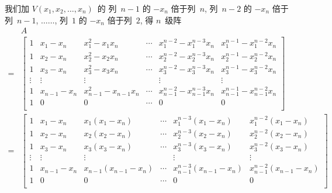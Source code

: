 \begin{example}
    我们加 \(V(x_1, x_2, \dots, x_n)\)~的%
    列~\(n-1\) 的 \(-x_n\) 倍于列~\(n\),
    列~\(n-2\) 的 \(-x_n\) 倍于列~\(n-1\),
    \(\dots \dots\),
    列~\(1\) 的 \(-x_n\) 倍于列~\(2\),
    得 \(n\)~级阵
    \begin{align*}
             & A
        \\
        = {} &
        \begin{bmatrix}
            1      & x_1 - x_n     & x_1^2 - x_1 x_n         & \cdots & x_1^{n-2} - x_1^{n-3} x_n         & x_1^{n-1} - x_1^{n-2} x_n         \\
            1      & x_2 - x_n     & x_2^2 - x_2 x_n         & \cdots & x_2^{n-2} - x_2^{n-3} x_n         & x_2^{n-1} - x_2^{n-2} x_n         \\
            1      & x_3 - x_n     & x_3^2 - x_3 x_n         & \cdots & x_3^{n-2} - x_3^{n-3} x_n         & x_3^{n-1} - x_3^{n-2} x_n         \\
            \vdots & \vdots        & \vdots                  & {}     & \vdots                            & \vdots                            \\
            1      & x_{n-1} - x_n & x_{n-1}^2 - x_{n-1} x_n & \cdots & x_{n-1}^{n-2} - x_{n-1}^{n-3} x_n & x_{n-1}^{n-1} - x_{n-1}^{n-2} x_n \\
            1      & 0             & 0                       & \cdots & 0                                 & 0                                 \\
        \end{bmatrix}
        \\
        = {} &
        \begin{bmatrix}
            1      & x_1 - x_n     & x_1 (x_1 - x_n)         & \cdots & x_1^{n-3} (x_1 - x_n)         & x_1^{n-2} (x_1 - x_n)         \\
            1      & x_2 - x_n     & x_2 (x_2 - x_n)         & \cdots & x_2^{n-3} (x_2 - x_n)         & x_2^{n-2} (x_2 - x_n)         \\
            1      & x_3 - x_n     & x_3 (x_3 - x_n)         & \cdots & x_3^{n-3} (x_3 - x_n)         & x_3^{n-2} (x_3 - x_n)         \\
            \vdots & \vdots        & \vdots                  & {}     & \vdots                        & \vdots                        \\
            1      & x_{n-1} - x_n & x_{n-1} (x_{n-1} - x_n) & \cdots & x_{n-1}^{n-3} (x_{n-1} - x_n) & x_{n-1}^{n-2} (x_{n-1} - x_n) \\
            1      & 0             & 0                       & \cdots & 0                             & 0                             \\

\end{bmatrix}
\end{align*}
\end{example}
